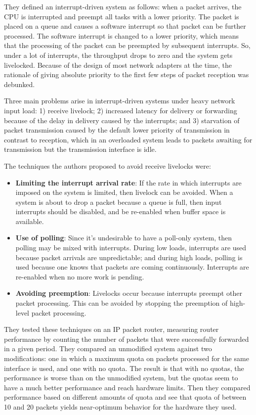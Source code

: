 \documentclass{article}
\begin{document}
They defined an interrupt-driven system as follows: when a packet arrives, the CPU is interrupted and preempt all tasks with a lower priority. The packet is placed on a queue and causes a software interrupt so that packet can be further processed. The software interrupt is changed to a lower priority, which means that the processing of the packet can be preempted by subsequent interrupts. So, under a lot of interrupts, the throughput drops to zero and the system gets livelocked. Because of the design of most network adapters at the time, the rationale of giving absolute priority to the first few steps of packet reception was debunked.

Three main problems arise in interrupt-driven systems under heavy network input load: 1) receive livelock; 2) increased latency for delivery or forwarding because of the delay in delivery caused by the interrupts; and 3) starvation of packet transmission caused by the default lower priority of transmission in contrast to reception, which in an overloaded system leads to packets awaiting for transmission but the transmission interface is idle.

The techniques the authors proposed to avoid receive livelocks were:

\begin{itemize}
	\item \textbf{Limiting the interrupt arrival rate}: If the rate in which interrupts are imposed on the system is limited, then livelock can be avoided. When a system is about to drop a packet because a queue is full, then input interrupts should be disabled, and be re-enabled when buffer space is available.

	\item \textbf{Use of polling}: Since it's undesirable to have a poll-only system, then polling may be mixed with interrupts. During low loads, interrupts are used because packet arrivals are unpredictable; and during high loads, polling is used because one knows that packets are coming continuously. Interrupts are re-enabled when no more work is pending.

	\item \textbf{Avoiding preemption}: Livelocks occur because interrupts preempt other packet processing. This can be avoided by stopping the preemption of high-level packet processing.

\end{itemize}

They tested these techniques on an IP packet router, measuring router performance by counting the number of packets that were successfully forwarded in a given period. They compared an unmodified system against two modifications: one in which a maximum quota on packets processed for the same interface is used, and one with no quota. The result is that with no quotas, the performance is worse than on the unmodified system, but the quotas seem to have a much better performance and reach hardware limits. Then they compared performance based on different amounts of quota and see that quota of between 10 and 20 packets yields near-optimum behavior for the hardware they used.
\end{document}
